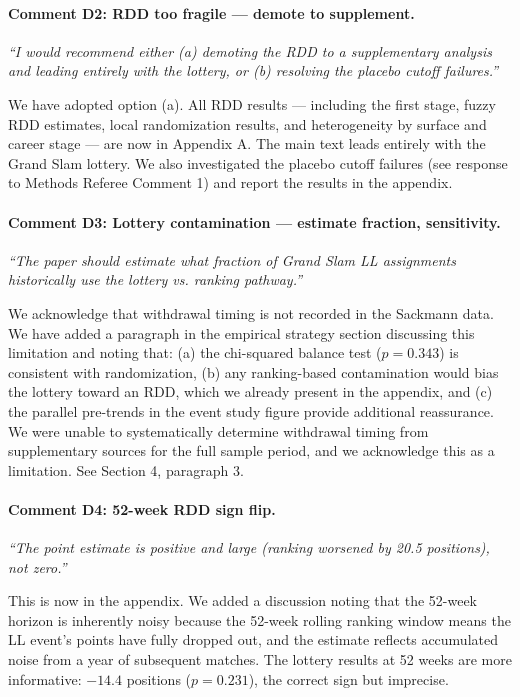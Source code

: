 \documentclass[12pt]{article}
\newcommand{\resp}[1]{\textcolor{response}{#1}}
\begin{document}
\paragraph{Comment D2: RDD too fragile --- demote to supplement.}
\textit{``I would recommend either (a) demoting the RDD to a supplementary analysis and leading entirely with the lottery, or (b) resolving the placebo cutoff failures.''}

\resp{We have adopted option (a). All RDD results --- including the first stage, fuzzy RDD estimates, local randomization results, and heterogeneity by surface and career stage --- are now in Appendix A. The main text leads entirely with the Grand Slam lottery. We also investigated the placebo cutoff failures (see response to Methods Referee Comment 1) and report the results in the appendix.}

\paragraph{Comment D3: Lottery contamination --- estimate fraction, sensitivity.}
\textit{``The paper should estimate what fraction of Grand Slam LL assignments historically use the lottery vs. ranking pathway.''}

\resp{We acknowledge that withdrawal timing is not recorded in the Sackmann data. We have added a paragraph in the empirical strategy section discussing this limitation and noting that: (a) the chi-squared balance test ($p = 0.343$) is consistent with randomization, (b) any ranking-based contamination would bias the lottery toward an RDD, which we already present in the appendix, and (c) the parallel pre-trends in the event study figure provide additional reassurance. We were unable to systematically determine withdrawal timing from supplementary sources for the full sample period, and we acknowledge this as a limitation. See Section 4, paragraph 3.}

\paragraph{Comment D4: 52-week RDD sign flip.}
\textit{``The point estimate is positive and large (ranking worsened by 20.5 positions), not zero.''}

\resp{This is now in the appendix. We added a discussion noting that the 52-week horizon is inherently noisy because the 52-week rolling ranking window means the LL event's points have fully dropped out, and the estimate reflects accumulated noise from a year of subsequent matches. The lottery results at 52 weeks are more informative: $-14.4$ positions ($p = 0.231$), the correct sign but imprecise.}
\end{document}
